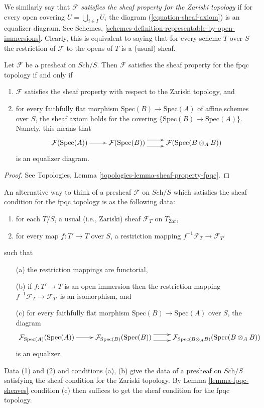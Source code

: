 \noindent
We similarly say that $\mathcal{F}$
{\it satisfies the sheaf property for the Zariski topology} if for
every open covering $U = \bigcup_{i \in I} U_i$ the diagram
(\ref{equation-sheaf-axiom}) is an equalizer diagram. See
Schemes, \ref{schemes-definition-representable-by-open-immersions}.
Clearly, this is equivalent to saying that for every scheme $T$ over $S$ the
restriction of $\mathcal{F}$ to the opens of $T$ is a (usual) sheaf.

\begin{lemma}
\label{lemma-fpqc-sheaves}
Let $\mathcal{F}$ be a presheaf on $\textit{Sch}/S$. Then
$\mathcal{F}$ satisfies the sheaf property for the fpqc topology
if and only if
\begin{enumerate}
\item $\mathcal{F}$ satisfies the sheaf property with respect to the
Zariski topology, and
\item for every faithfully flat morphism $\text{Spec}(B) \to \text{Spec}(A)$
of affine schemes over $S$, the sheaf axiom holds for the covering
$\{\text{Spec}(B) \to \text{Spec}(A)\}$. Namely, this means that
$$
\xymatrix{
\mathcal{F}(\text{Spec}(A)) \ar[r] &
\mathcal{F}(\text{Spec}(B)) \ar@<1ex>[r] \ar@<-1ex>[r] &
\mathcal{F}(\text{Spec}(B \otimes_A B))
}
$$
is an equalizer diagram.
\end{enumerate}
\end{lemma}

\begin{proof}
See Topologies, Lemma \ref{topologies-lemma-sheaf-property-fpqc}.
\end{proof}

\noindent
An alternative way to think of a presheaf $\mathcal{F}$ on
$\textit{Sch}/S$ which satisfies the sheaf condition for the
fpqc topology is as the following data:
\begin{enumerate}
\item for each $T/S$, a usual (i.e., Zariski) sheaf $\mathcal{F}_T$ on
$T_{\mathrm{Zar}}$,
\item for every map $f : T' \to T$ over $S$, a restriction mapping
$f^{-1}\mathcal{F}_T \to \mathcal{F}_{T'}$
\end{enumerate}
such that
\begin{enumerate}
\item[(a)] the restriction mappings are functorial,
\item[(b)] if $f : T' \to T$ is an open immersion then the restriction
mapping $f^{-1}\mathcal{F}_T \to \mathcal{F}_{T'}$ is an isomorphism, and
\item[(c)] for every faithfully flat morphism
$\text{Spec}(B) \to \text{Spec}(A)$ over $S$, the diagram
$$
\xymatrix{
\mathcal{F}_{\text{Spec}(A)}(\text{Spec}(A)) \ar[r] &
\mathcal{F}_{\text{Spec}(B)}(\text{Spec}(B)) \ar@<1ex>[r] \ar@<-1ex>[r] &
\mathcal{F}_{\text{Spec}(B \otimes_A B)}(\text{Spec}(B \otimes_A B))
}
$$
is an equalizer.
\end{enumerate}
Data (1) and (2) and conditions (a), (b) give the data of a presheaf
on $\textit{Sch}/S$ satisfying the sheaf condition for the Zariski topology.
By Lemma \ref{lemma-fpqc-sheaves} condition (c) then suffices to get the
sheaf condition for the fpqc topology.

